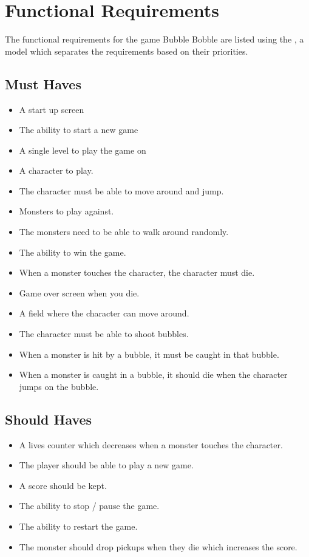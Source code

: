 \chapter{Functional Requirements}

The functional requirements for the game Bubble Bobble are listed using the , a model which separates the requirements based on their priorities.



\section{Must Haves}

\begin{itemize}
\itemsep0em 
 	\item A start up screen
  	\item The ability to start a new game
  	\item A single level to play the game on
  	\item A character to play.
  	\item The character must be able to move around and jump.
  	\item Monsters to play against.
  	\item The monsters need to be able to walk around randomly.
 	\item The ability to win the game.
	\item When a monster touches the character, the character must die.
 	\item Game over screen when you die.
 	\item A field where the character can move around.
 	\item The character must be able to shoot bubbles.
 	\item When a monster is hit by a bubble, it must be caught in that bubble.
	\item When a monster is caught in a bubble, it should die when the character jumps on the bubble. 
\end{itemize}

\section{Should Haves}

\begin{itemize}
\itemsep0em 
 \item A lives counter which decreases when a monster touches the character.
 \item The player should be able to play a new game. 
 \item A score should be kept. 
 \item The ability to stop / pause the game.
 \item The ability to restart the game.
 \item The monster should drop pickups when they die which increases the score.
\end{itemize}

